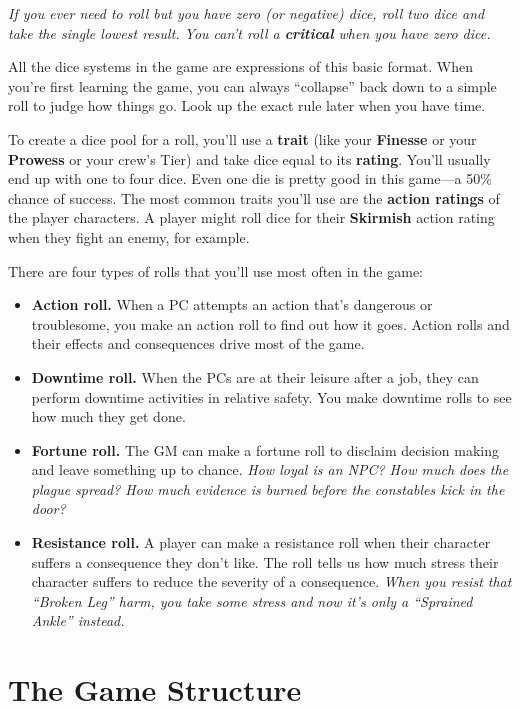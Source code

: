 \documentclass[11pt,fleqn,a5paper]{book}
\newcommand{\gameterm}[1]{\textbf{#1}}
\begin{document}
\emph{If you ever need to roll but you have zero (or negative) dice, roll two dice and take the single lowest result. You can’t roll a \textbf{critical} when you have zero dice.}

All the dice systems in the game are expressions of this basic format. When you’re first learning the game, you can always “collapse” back down to a simple roll to judge how things go. Look up the exact rule later when you have time.

To create a dice pool for a roll, you’ll use a \textbf{trait} (like your \gameterm{Finesse}  or your \gameterm{Prowess}  or your crew’s Tier) and take dice equal to its \textbf{rating}. You’ll usually end up with one to four dice. Even one die is pretty good in this game---a 50\% chance of success. The most common traits you’ll use are the \textbf{action ratings} of the player characters. A player might roll dice for their \gameterm{Skirmish}  action rating when they fight an enemy, for example.

There are four types of rolls that you’ll use most often in the game:

\begin{itemize}
	\item \gameterm{Action roll. } When a PC attempts an action that’s dangerous or troublesome, you make an action roll to find out how it goes. Action rolls and their effects and consequences drive most of the game.
	\item \gameterm{Downtime roll. } When the PCs are at their leisure after a job, they can perform downtime activities in relative safety. You make downtime rolls to see how much they get done.
	\item \gameterm{Fortune roll. } The GM can make a fortune roll to disclaim decision making and leave something up to chance. \emph{How loyal is an NPC? How much does the plague spread? How much evidence is burned before the constables kick in the door?}
	\item \gameterm{Resistance roll. } A player can make a resistance roll when their character suffers a consequence they don’t like. The roll tells us how much stress their character suffers to reduce the severity of a consequence. \emph{When you resist that “Broken Leg” harm, you take some stress and now it’s only a “Sprained Ankle” instead.}
\end{itemize}

\section{The Game Structure}
\end{document}
